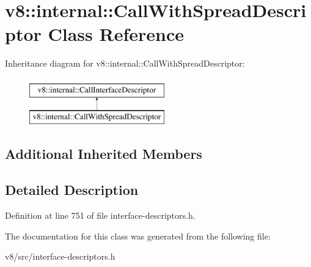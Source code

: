 \hypertarget{classv8_1_1internal_1_1CallWithSpreadDescriptor}{}\section{v8\+:\+:internal\+:\+:Call\+With\+Spread\+Descriptor Class Reference}
\label{classv8_1_1internal_1_1CallWithSpreadDescriptor}
Inheritance diagram for v8\+:\+:internal\+:\+:Call\+With\+Spread\+Descriptor\+:\begin{figure}[H]
\begin{center}
\leavevmode
\includegraphics[height=2.000000cm]{classv8_1_1internal_1_1CallWithSpreadDescriptor}
\end{center}
\end{figure}
\subsection*{Additional Inherited Members}


\subsection{Detailed Description}


Definition at line 751 of file interface-\/descriptors.\+h.



The documentation for this class was generated from the following file\+:\begin{DoxyCompactItemize}
\item 
v8/src/interface-\/descriptors.\+h\end{DoxyCompactItemize}
